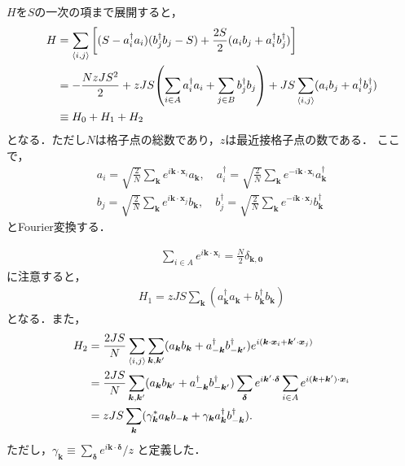 \documentclass[dvipdfmx,9pt]{beamer}
\numberwithin{equation}{section}
\begin{document}
\begin{frame}
    $H$を$S$の一次の項まで展開すると，
    \begin{align}
        H
        & \nonumber
        = \sum_{\expval{i,j}}\qty[(S - a_i^\dagger a_i)(b_j^\dagger b_j - S)+\frac{2S}{2}(a_i b_j + a_i^\dagger b_j^\dagger)]
        \\ & \nonumber
        = -\frac{NzJS^2}{2} + zJS \qty(\sum_{i \in A} a_i^\dagger a_i + \sum_{j \in B} b_j^\dagger b_j)
        +JS \sum_{\expval{i,j}}(a_i b_j + a_i^\dagger b_j^\dagger)
        \\ &
        \equiv H_0 + H_1 + H_2
    \end{align}
    となる．ただし$N$は格子点の総数であり，$z$は最近接格子点の数である．
    ここで，
    \begin{align}
        a_i = \sqrt{\frac{2}{N}} \sum_{\bm{k}} e^{i\bm{k}\cdot \bm{x}_i} a_{\bm{k}},
        \quad
        a_i^\dagger = \sqrt{\frac{2}{N}} \sum_{\bm{k}} e^{-i \bm{k}\cdot \bm{x}_i} a_{\bm{k}}^\dagger
        \\
        b_j = \sqrt{\frac{2}{N}} \sum_{\bm{k}} e^{i \bm{k}\cdot \bm{x}_j} b_{\bm{k}},
        \quad
        b_j^\dagger = \sqrt{\frac{2}{N}} \sum_{\bm{k}} e^{-i \bm{k}\cdot \bm{x}_j} b_{\bm{k}}^\dagger
    \end{align}
    とFourier変換する．
\end{frame}

\begin{frame}{}
    \begin{align}
        \sum_{i \in A} e^{i \bm{k} \cdot \bm{x}_i} = \frac{N}{2}\delta_{\bm{k},\bm{0}}
    \end{align}
    に注意すると，
    \begin{align}
        H_1 = zJS \sum_{\bm{k}}(a_{\bm{k}}^\dagger a_{\bm{k}} + b_{\bm{k}}^\dagger b_{\bm{k}})
    \end{align}
    となる．また，
    \begin{align}
        H_2
        &\nonumber
        = \frac{2JS}{N} \sum_{\expval{i,j}} \sum_{\bm{k}, \bm{k}'} (a_{\bm{k}} b_{\bm{k}} + a_{-\bm{k}}^\dagger b_{-\bm{k}'}^\dagger)e^{i (\bm{k}\cdot \bm{x}_i + \bm{k}' \cdot \bm{x}_j)}
        \\ &\nonumber
        = \frac{2JS}{N} \sum_{\bm{k}, \bm{k}'} (a_{\bm{k}} b_{\bm{k}'} + a_{-\bm{k}}^\dagger b_{-\bm{k}'}^\dagger) 
        \sum_{\bm{\delta}} e^{i \bm{k}'\cdot \bm{\delta}}
        \sum_{i \in A}  e^{i(\bm{k}+\bm{k}')\cdot \bm{x}_i}
        \\ &
        = zJS \sum_{\bm{k}} (\gamma_{\bm{k}}^* a_{\bm{k}} b_{-\bm{k}} + \gamma_{\bm{k}} a_{\bm{k}}^\dagger b_{-\bm{k}}^\dagger).
    \end{align}
    ただし，$\gamma_{\bm{k}} \equiv \sum_{\bm{\delta}} e^{i \bm{k}\cdot \bm{\delta}}/z$
    と定義した．
\end{frame}
\end{document}
